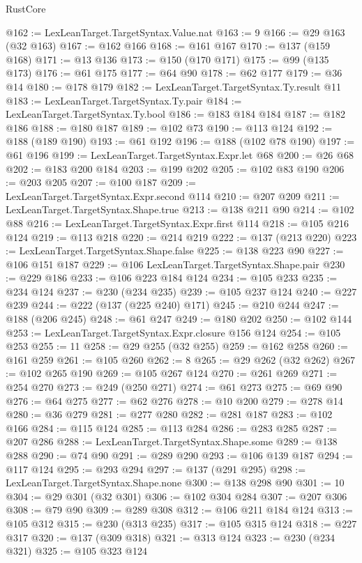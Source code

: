 \begin{lexlean}{RustCore}
\begin{coremodule}
@162 := LexLeanTarget.TargetSyntax.Value.nat
@163 := 9
@166 := @29 @163 (@32 @163)
@167 := @162 @166
@168 := @161 @167
@170 := @137 (@159 @168)
@171 := @13 @136
@173 := @150 (@170 @171)
@175 := @99 (@135 @173)
@176 := @61 @175
@177 := @64 @90
@178 := @62 @177
@179 := @36 @14
@180 := @178 @179
@182 := LexLeanTarget.TargetSyntax.Ty.result @11
@183 := LexLeanTarget.TargetSyntax.Ty.pair
@184 := LexLeanTarget.TargetSyntax.Ty.bool
@186 := @183 @184 @184
@187 := @182 @186
@188 := @180 @187
@189 := @102 @73
@190 := @113 @124
@192 := @188 (@189 @190)
@193 := @61 @192
@196 := @188 (@102 @78 @190)
@197 := @61 @196
@199 := LexLeanTarget.TargetSyntax.Expr.let @68
@200 := @26 @68
@202 := @183 @200 @184
@203 := @199 @202
@205 := @102 @83 @190
@206 := @203 @205
@207 := @100 @187
@209 := LexLeanTarget.TargetSyntax.Expr.second @114
@210 := @207 @209
@211 := LexLeanTarget.TargetSyntax.Shape.true
@213 := @138 @211 @90
@214 := @102 @88
@216 := LexLeanTarget.TargetSyntax.Expr.first @114
@218 := @105 @216 @124
@219 := @113 @218
@220 := @214 @219
@222 := @137 (@213 @220)
@223 := LexLeanTarget.TargetSyntax.Shape.false
@225 := @138 @223 @90
@227 := @106 @151 @187
@229 := @106 LexLeanTarget.TargetSyntax.Shape.pair
@230 := @229 @186
@233 := @106 @223 @184 @124
@234 := @105 @233
@235 := @234 @124
@237 := @230 (@234 @235)
@239 := @105 @237 @124
@240 := @227 @239
@244 := @222 (@137 (@225 @240) @171)
@245 := @210 @244
@247 := @188 (@206 @245)
@248 := @61 @247
@249 := @180 @202
@250 := @102 @144
@253 := LexLeanTarget.TargetSyntax.Expr.closure @156 @124
@254 := @105 @253
@255 := 11
@258 := @29 @255 (@32 @255)
@259 := @162 @258
@260 := @161 @259
@261 := @105 @260
@262 := 8
@265 := @29 @262 (@32 @262)
@267 := @102 @265 @190
@269 := @105 @267 @124
@270 := @261 @269
@271 := @254 @270
@273 := @249 (@250 @271)
@274 := @61 @273
@275 := @69 @90
@276 := @64 @275
@277 := @62 @276
@278 := @10 @200
@279 := @278 @14
@280 := @36 @279
@281 := @277 @280
@282 := @281 @187
@283 := @102 @166
@284 := @115 @124
@285 := @113 @284
@286 := @283 @285
@287 := @207 @286
@288 := LexLeanTarget.TargetSyntax.Shape.some
@289 := @138 @288
@290 := @74 @90
@291 := @289 @290
@293 := @106 @139 @187
@294 := @117 @124
@295 := @293 @294
@297 := @137 (@291 @295)
@298 := LexLeanTarget.TargetSyntax.Shape.none
@300 := @138 @298 @90
@301 := 10
@304 := @29 @301 (@32 @301)
@306 := @102 @304 @284
@307 := @207 @306
@308 := @79 @90
@309 := @289 @308
@312 := @106 @211 @184 @124
@313 := @105 @312
@315 := @230 (@313 @235)
@317 := @105 @315 @124
@318 := @227 @317
@320 := @137 (@309 @318)
@321 := @313 @124
@323 := @230 (@234 @321)
@325 := @105 @323 @124

\end{coremodule}
\end{lexlean}
